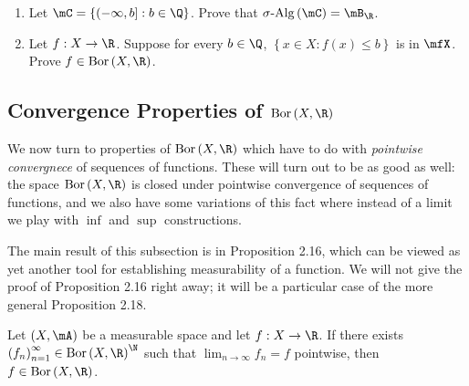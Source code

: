 \documentclass[pmath450]{subfiles}
\begin{document}
    \begin{exercise}{}
        \vspace{-11pt}
        \begin{enumerate}
            \item Let $\mC=\left\lbrace \left( -\infty,b \right]: b\in\Q \right\rbrace$. Prove that $\sigalg\left( \mC \right)=\mB_{\R}$.
            \item Let $f:X\to\R$. Suppose for every $b\in\Q$, $\left\lbrace x\in X: f\left( x \right)\leq b \right\rbrace$ is in $\mfX$. Prove $f\in\bor\left( X,\R \right)$.
        \end{enumerate}
    \end{exercise}

    \placeqed[tl;dr]

    \subsection{Convergence Properties of $\bor\left( X,\R \right)$}

    \np We now turn to properties of $\bor\left( X,\R \right)$ which have to do with \textit{pointwise convergnece} of sequences of functions. These will turn out to be  as good as well: the space $\bor\left( X,\R \right)$ is closed under pointwise convergence of sequences of functions, and we also have some variations of this fact where instead of a limit we play with $\inf$ and $\sup$ constructions.

    \np The main result of this subsection is in Proposition 2.16, which can be viewed as yet another tool for establishing measurability of a function. We will not give the proof of Proposition 2.16 right away; it will be a particular case of the more general Proposition 2.18.

    \begin{prop}{}
        Let $\left( X,\mA \right)$ be a measurable space and let $f:X\to\R$. If there exists $\left( f_{n} \right)^{\infty}_{n=1}\in\bor\left( X,\R \right)^{\N}$ such that $\lim_{n\to\infty}f_n = f$ pointwise, then $f\in\bor\left( X,\R \right)$.
    \end{prop}

\end{document}
